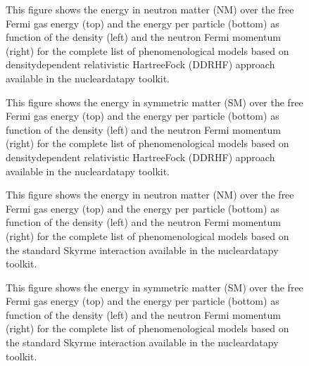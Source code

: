 \documentclass[letterpaper,10pt,english]{sphinxmanual}
\begin{document}
\begin{figure}[htbp]
\centering
\capstart

\noindent{}
\caption{This figure shows the energy in neutron matter (NM) over the free Fermi gas energy (top) and the energy per particle (bottom) as function of the density (left) and the neutron Fermi momentum (right) for the complete list of phenomenological models based on density\sphinxhyphen{}dependent relativistic Hartree\sphinxhyphen{}Fock (DDRHF) approach available in the nucleardatapy toolkit.}\label{\detokenize{source/api/setup_pheno_matter:id5}}\end{figure}

\begin{figure}[htbp]
\centering
\capstart

\noindent{}
\caption{This figure shows the energy in symmetric matter (SM) over the free Fermi gas energy (top) and the energy per particle (bottom) as function of the density (left) and the neutron Fermi momentum (right) for the complete list of phenomenological models based on density\sphinxhyphen{}dependent relativistic Hartree\sphinxhyphen{}Fock (DDRHF) approach available in the nucleardatapy toolkit.}\label{\detokenize{source/api/setup_pheno_matter:id6}}\end{figure}

\begin{figure}[htbp]
\centering
\capstart

\noindent{}
\caption{This figure shows the energy in neutron matter (NM) over the free Fermi gas energy (top) and the energy per particle (bottom) as function of the density (left) and the neutron Fermi momentum (right) for the complete list of phenomenological models based on the standard Skyrme interaction available in the nucleardatapy toolkit.}\label{\detokenize{source/api/setup_pheno_matter:id7}}\end{figure}

\begin{figure}[htbp]
\centering
\capstart

\noindent{}
\caption{This figure shows the energy in symmetric matter (SM) over the free Fermi gas energy (top) and the energy per particle (bottom) as function of the density (left) and the neutron Fermi momentum (right) for the complete list of phenomenological models based on the standard Skyrme interaction available in the nucleardatapy toolkit.}\label{\detokenize{source/api/setup_pheno_matter:id8}}\end{figure}
\end{document}
